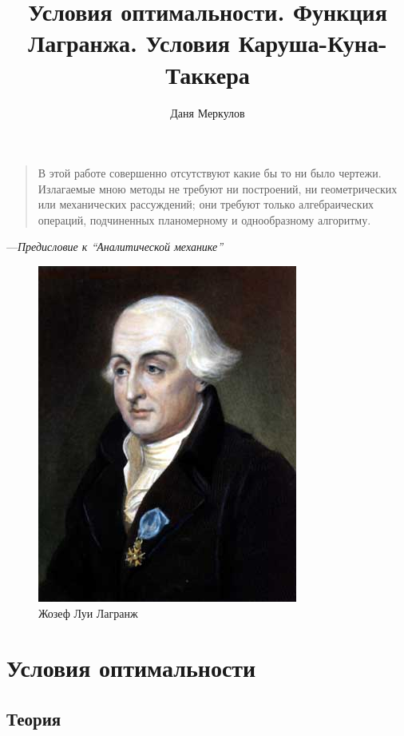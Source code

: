 \documentclass[
  russian,
  letterpaper,
  DIV=11,
  numbers=noendperiod]{scrartcl}
\title{Условия оптимальности. Функция Лагранжа. Условия
Каруша-Куна-Таккера}
\author{Даня Меркулов}
\date{}
\begin{document}
\maketitle


\begin{quote}
В этой работе совершенно отсутствуют какие бы то ни было чертежи.
Излагаемые мною методы не требуют ни построений, ни геометрических или
механических рассуждений; они требуют только алгебраических операций,
подчиненных планомерному и однообразному алгоритму.
\end{quote}

---\emph{Предисловие к ``Аналитической механике''}

\begin{figure}[H]

{\centering \includegraphics[width=0.5\linewidth,height=\textheight,keepaspectratio]{lagrange.jpg}

}

\caption{Жозеф Луи Лагранж}

\end{figure}%

\section{Условия
оптимальности}\label{ux443ux441ux43bux43eux432ux438ux44f-ux43eux43fux442ux438ux43cux430ux43bux44cux43dux43eux441ux442ux438}

\subsection{Теория}\label{ux442ux435ux43eux440ux438ux44f}
\end{document}
